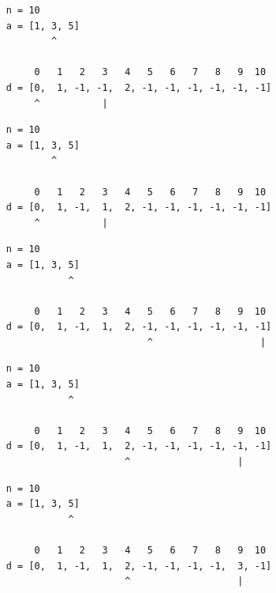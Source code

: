 \begin{frame}[fragile]
\begin{verbatim}
     n = 10
     a = [1, 3, 5]
             ^

          0   1   2   3   4   5   6   7   8   9  10
     d = [0,  1, -1, -1,  2, -1, -1, -1, -1, -1, -1]
          ^           |
\end{verbatim}
\end{frame}
\addtocounter{framenumber}{-1}

\begin{frame}[fragile]
\begin{verbatim}
     n = 10
     a = [1, 3, 5]
             ^

          0   1   2   3   4   5   6   7   8   9  10
     d = [0,  1, -1,  1,  2, -1, -1, -1, -1, -1, -1]
          ^           |
\end{verbatim}
\end{frame}
\addtocounter{framenumber}{-1}

\begin{frame}[fragile]
\begin{verbatim}
     n = 10
     a = [1, 3, 5]
                ^

          0   1   2   3   4   5   6   7   8   9  10
     d = [0,  1, -1,  1,  2, -1, -1, -1, -1, -1, -1]
                              ^                   |
\end{verbatim}
\end{frame}
\addtocounter{framenumber}{-1}

\begin{frame}[fragile]
\begin{verbatim}
     n = 10
     a = [1, 3, 5]
                ^

          0   1   2   3   4   5   6   7   8   9  10
     d = [0,  1, -1,  1,  2, -1, -1, -1, -1, -1, -1]
                          ^                   |
\end{verbatim}
\end{frame}
\addtocounter{framenumber}{-1}

\begin{frame}[fragile]
\begin{verbatim}
     n = 10
     a = [1, 3, 5]
                ^

          0   1   2   3   4   5   6   7   8   9  10
     d = [0,  1, -1,  1,  2, -1, -1, -1, -1,  3, -1]
                          ^                   |
\end{verbatim}
\end{frame}
\addtocounter{framenumber}{-1}

